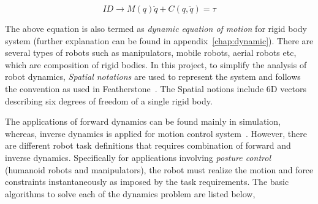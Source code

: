\begin{equation}
	\label{eq:ID}
	ID \rightarrow M(q)\ddot{q} + C(q, \ddot{q}) = \tau
\end{equation}

The above equation is also termed as \textit{dynamic equation of motion} for rigid body system (further explanation can be found in appendix~\ref{chap:dynamic}). There are several types of robots such as manipulators, mobile robots, aerial robots etc, which are composition of rigid bodies. In this project, to simplify the analysis of robot dynamics, \textit{Spatial notations} are used to represent the system and follows the convention as used in Featherstone~\cite{featherstone2014rigid}. The Spatial notions include 6D vectors describing six degrees of freedom of a single rigid body. 

The applications of forward dynamics can be found mainly in simulation, whereas, inverse dynamics is applied for motion control system~\cite{featherstone1984robot}. However, there are different robot task definitions that requires combination of forward and inverse dynamics. Specifically for applications involving \textit{posture control} (humanoid robots and manipulators), the robot must realize the motion and force constraints instantaneously as imposed by the task requirements. The basic algorithms to solve each of the dynamics problem are listed below,
